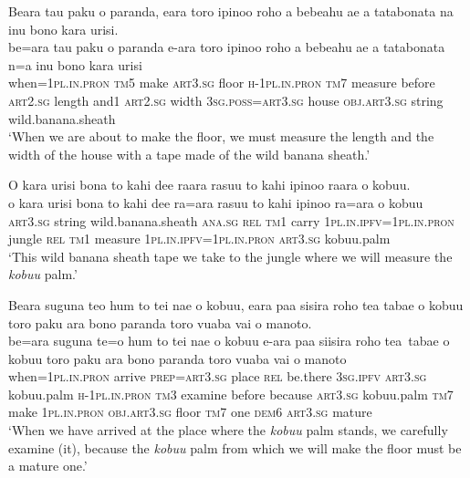 \ea\label{ex:text15-6}
Beara tau paku o paranda, eara toro ipinoo roho a bebeahu ae a tatabonata na inu bono kara urisi.\\
\gll be=ara	tau	paku	o	paranda	e-ara	toro	ipinoo	roho	a	bebeahu	ae	a	tatabonata	n=a	inu	bono	kara	urisi\\
     when=1\textsc{pl}.\textsc{in}.\textsc{pron}	\textsc{tm}5	make	\textsc{art}3.\textsc{sg}	floor	\textsc{h}-1\textsc{pl}.\textsc{in}.\textsc{pron}	\textsc{tm}7	measure	before	\textsc{art}2.\textsc{sg}	length	and1	\textsc{art}2.\textsc{sg}	width	3\textsc{sg}.\textsc{poss}=\textsc{art}3.\textsc{sg}	house	\textsc{obj}.\textsc{art}3.\textsc{sg}	string	wild.banana.sheath\\
\glt `When we are about to make the floor, we must measure the length and the width of the house with a tape made of the wild banana sheath.'
\z

\ea\label{ex:text15-7}
O kara urisi bona to kahi dee raara rasuu to kahi ipinoo raara o kobuu.\\
\gll o	kara	urisi	bona	to	kahi	dee	ra=ara	rasuu	to	kahi	ipinoo	ra=ara	o	kobuu\\
     \textsc{art}3.\textsc{sg}	string	wild.banana.sheath	\textsc{ana}.\textsc{sg}	\textsc{rel}	\textsc{tm}1	carry	1\textsc{pl}.\textsc{in}.\textsc{ipfv}=1\textsc{pl}.\textsc{in}.\textsc{pron}	jungle	\textsc{rel}	\textsc{tm}1	measure	1\textsc{pl}.\textsc{in}.\textsc{ipfv}=1\textsc{pl}.\textsc{in}.\textsc{pron}	\textsc{art}3.\textsc{sg}	kobuu.palm\\
\glt `This wild banana sheath tape we take to the jungle where we will measure the \textit{kobuu} palm.'
\z

\ea\label{ex:text15-8}
Beara suguna teo hum to tei nae o kobuu, eara paa sisira roho tea tabae o kobuu toro paku ara bono paranda toro vuaba vai o manoto.\\
\gll be=ara	suguna	te=o	hum	to	tei	nae	o	kobuu	e-ara	paa	siisira	roho	tea~tabae	o	kobuu	toro	paku	ara	bono	paranda	toro	vuaba	vai	o	manoto\\
     when=1\textsc{pl}.\textsc{in}.\textsc{pron}	arrive	\textsc{prep}=\textsc{art}3.\textsc{sg}	place	\textsc{rel}	be.there	3\textsc{sg}.\textsc{ipfv}	\textsc{art}3.\textsc{sg}	kobuu.palm	\textsc{h}-1\textsc{pl}.\textsc{in}.\textsc{pron}	\textsc{tm}3	examine	before	because	\textsc{art}3.\textsc{sg}	kobuu.palm	\textsc{tm}7	make	1\textsc{pl}.\textsc{in}.\textsc{pron}	\textsc{obj}.\textsc{art}3.\textsc{sg}	floor	\textsc{tm}7	one	\textsc{dem}6	\textsc{art}3.\textsc{sg}	mature\\
\glt `When we have arrived at the place where the \textit{kobuu} palm stands, we carefully examine (it), because the \textit{kobuu} palm from which we will make the floor must be a mature one.'
\z

